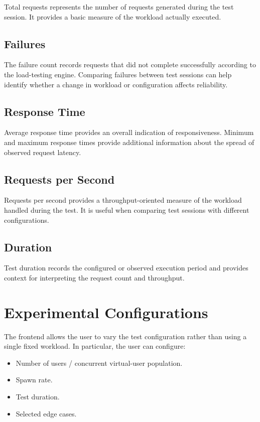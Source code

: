 \documentclass{tietreport}
\begin{document}
Total requests represents the number of requests generated during the test session. It provides a basic measure of the workload actually executed.

\subsection{Failures}

The failure count records requests that did not complete successfully according to the load-testing engine. Comparing failures between test sessions can help identify whether a change in workload or configuration affects reliability.

\subsection{Response Time}

Average response time provides an overall indication of responsiveness. Minimum and maximum response times provide additional information about the spread of observed request latency.

\subsection{Requests per Second}

Requests per second provides a throughput-oriented measure of the workload handled during the test. It is useful when comparing test sessions with different configurations.

\subsection{Duration}

Test duration records the configured or observed execution period and provides context for interpreting the request count and throughput.

\section{Experimental Configurations}

The frontend allows the user to vary the test configuration rather than using a single fixed workload. In particular, the user can configure:

\begin{itemize}
    \item Number of users / concurrent virtual-user population.
    \item Spawn rate.
    \item Test duration.
    \item Selected edge cases.
\end{itemize}
\end{document}
